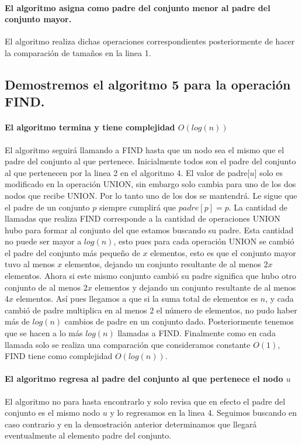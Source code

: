 \documentclass[12pt]{article}
\begin{document}
\paragraph{El algoritmo asigna como padre del conjunto menor al padre del conjunto mayor.}
El algoritmo realiza dichas operaciones correspondientes posteriormente de hacer la comparación de tamaños en la linea 1.
\subsection{Demostremos el algoritmo 5 para la operación FIND.}
\paragraph{El algoritmo termina y tiene complejidad $O(log(n))$} El algoritmo seguirá llamando a FIND hasta que un nodo sea el mismo que el padre del conjunto al que pertenece. Inicialmente todos son el padre del conjunto al que pertenecen por la linea 2 en el algoritmo 4. El valor de padre[$u$] solo es modificado en la operación UNION, sin embargo solo cambia para uno de los dos nodos que recibe UNION. Por lo tanto uno de los dos se mantendrá. Le sigue que el padre de un conjunto $p$ siempre cumplirá que $padre[p] = p$. La cantidad de llamadas que realiza FIND corresponde a la cantidad de operaciones UNION hubo para formar al conjunto del que estamos buscando su padre. Esta cantidad no puede ser mayor a $log(n)$, esto pues para cada operación UNION se cambió el padre del conjunto más pequeño de $x$ elementos, esto es que el conjunto mayor tuvo al menos $x$ elementos, dejando un conjunto resultante de al menos $2x$ elementos. Ahora si este mismo conjunto cambió su padre significa que hubo otro conjunto de al menos $2x$ elementos y dejando un conjunto resultante de al menos $4x$ elementos. Así pues llegamos a que si la suma total de elementos es $n$, y cada cambió de padre multiplica en al menos 2 el número de elementos, no pudo haber más de $log(n)$ cambios de padre en un conjunto dado. Posteriormente tenemos que se hacen a lo más $log(n)$ llamadas a FIND. Finalmente como en cada llamada solo se realiza una comparación que consideramos constante $O(1)$, FIND tiene como complejidad $O(log(n))$.
\paragraph{El algoritmo regresa al padre del conjunto al que pertenece el nodo $u$}
El algoritmo no para hasta encontrarlo y solo revisa que en efecto el padre del conjunto es el mismo nodo $u$ y lo regresamos en la linea 4. Seguimos buscando en caso contrario y en la demostración anterior determinamos que llegará eventualmente al elemento padre del conjunto.
\end{document}

